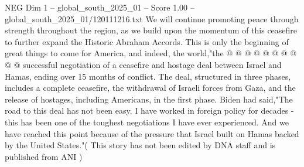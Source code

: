 \begin{textsample}{NEG Dim 1 – global\_south\_2025\_01 – Score 1.00 – global\_south\_2025\_01/120111216.txt}
We will continue promoting peace through strength throughout the region, as we build upon the momentum of this ceasefire to further expand the Historic Abraham Accords.
This is only the beginning of great things to come for America, and indeed, the world,"the @ @ @ @ @ @ @ @ @ @ successful negotiation of a ceasefire and hostage deal between Israel and Hamas, ending over 15 months of conflict.
The deal, structured in three phases, includes a complete ceasefire, the withdrawal of Israeli forces from Gaza, and the release of hostages, including Americans, in the first phase.
Biden had said,"The road to this deal has not been easy.
I have worked in foreign policy for decades - this has been one of the toughest negotiations I have ever experienced.
And we have reached this point because of the pressure that Israel built on Hamas backed by the United States."( This story has not been edited by DNA staff and is published from ANI )

\end{textsample}
